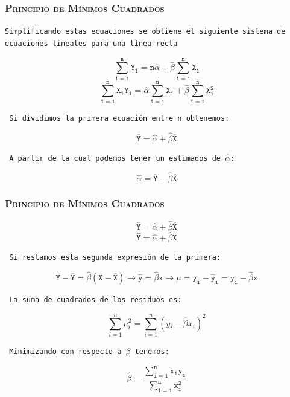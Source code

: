 \documentclass[16.5pt]{beamer}
\begin{document}
{
\begin{frame}
\frametitle{\textsc{Principio de Mínimos Cuadrados}}
\hspace*{-5mm}
\vspace*{-5mm} 

\texttt{Simplificando estas ecuaciones se obtiene el siguiente sistema de ecuaciones lineales para una línea recta}



$$\mathtt{\sum_{i=1}^n Y_i =n\hat{\alpha} +\hat{\beta}\sum_{i=1}^n X_i} $$
$$\mathtt{\sum_{i=1}^n X_iY_i =\hat{\alpha}\sum_{i=1}^n X_i +\hat{\beta}\sum_{i=1}^n X_i^2} $$

\texttt{ Si dividimos la primera ecuación entre n obtenemos:}

$$\mathtt{\overline{Y}=\hat{\alpha} + \hat{\beta}\overline{X}}$$

\texttt{ A partir de la cual podemos tener un estimados de $\hat\alpha$:}

$$\mathtt{\boxed{\hat\alpha=\overline{Y} - \hat{\beta}\overline{X}}}$$

\end{frame}
}

{
\begin{frame}
\frametitle{\textsc{Principio de Mínimos Cuadrados}}
\hspace*{-5mm}
\vspace*{-5mm} 


$$\mathtt{\overline{Y}=\hat{\alpha} + \hat{\beta}\overline{X}}$$
$$\mathtt{\hat{Y}=\hat{\alpha} + \hat{\beta}X}$$

\texttt{ Si restamos esta segunda expresión de la primera:}

$$\mathtt{\hat{Y} - \overline{Y}= \hat{\beta}(X-\overline{X}) \rightarrow  \hat{y} = \hat{\beta}x \rightarrow \mu= y_i - \hat{y}_i =y_i- \hat{\beta}x }$$

\texttt{ La suma de cuadrados de los residuos es:}

$$\sum_{i=1}^n \mu_i^2= \sum_{i=1}^n (y_i- \hat{\beta}x_i)^2$$

\texttt{ Minimizando con respecto a $\beta$ tenemos:}

$$\mathtt{\boxed{\hat\beta=\frac{\sum_{i=1}^n x_iy_i}{\sum_{i=1}^n x_i^2}}}$$

\end{frame}
}
\end{document}
